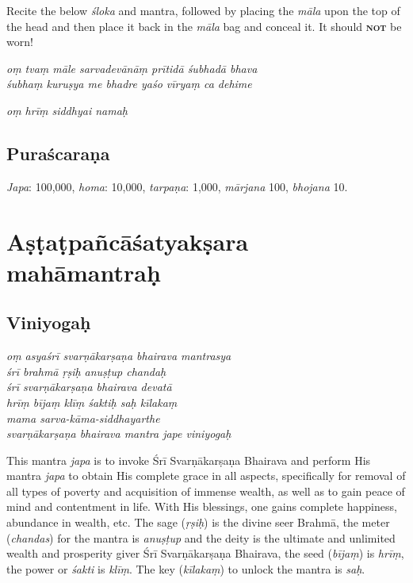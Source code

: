 \documentclass[11pt,oneside,a4paper]{article}
\newenvironment{shloka}[1]
  {\bigskip\center#1\varwidth{\linewidth}}
  {\endvarwidth\endcenter\bigskip}
\newcommand{\tl}[1]{\emph{#1}}
\begin{document}
Recite the below \tl{śloka} and mantra, followed by placing the \tl{māla} upon
the top of the head and then place it back in the \tl{māla} bag and conceal it.
It should \textsc{\textbf{not}} be worn!

\begin{shloka}\itshape
  oṃ tvaṃ māle sarvadevānāṃ prītidā śubhadā bhava\\
  śubhaṃ kuruṣya me bhadre yaśo vīryaṃ ca dehime
\end{shloka}

\begin{shloka}\itshape
  oṃ hrīṃ siddhyai namaḥ
\end{shloka}

\subsection{Puraścaraṇa}

\tl{Japa}: 100,000, \tl{homa}: 10,000, \tl{tarpaṇa}: 1,000, \tl{mārjana} 100,
\tl{bhojana} 10.
\clearpage

\section{Aṣṭaṭpañcāśatyakṣara mahāmantraḥ}

\subsection{Viniyogaḥ}

\begin{shloka}\itshape
  oṃ asyaśrī svarṇākarṣaṇa bhairava mantrasya\\
  śrī brahmā ṛṣiḥ anuṣṭup chandaḥ\\
  śrī svarṇākarṣaṇa bhairava devatā\\
  hrīṃ bījaṃ klīṃ śaktiḥ saḥ kīlakaṃ\\
  mama sarva-kāma-siddhayarthe\\
  svarṇākarṣaṇa bhairava mantra jape viniyogaḥ
\end{shloka}

This mantra \tl{japa} is to invoke Śrī Svarṇākarṣaṇa Bhairava and perform His
mantra \tl{japa} to obtain His complete grace in all aspects, specifically for
removal of all types of poverty and acquisition of immense wealth, as well as
to gain peace of mind and contentment in life. With His blessings, one gains
complete happiness, abundance in wealth, etc. The sage (\tl{ṛṣiḥ}) is the divine
seer Brahmā, the meter (\tl{chandas}) for the mantra is \tl{anuṣṭup} and
the deity is the ultimate and unlimited wealth and prosperity giver Śrī
Svarṇākarṣaṇa Bhairava, the seed (\tl{bījaṃ}) is \tl{hrīṃ}, the power or
\tl{śakti} is \tl{klīṃ}. The key (\tl{kīlakaṃ}) to unlock the mantra
is \tl{saḥ}.
\end{document}

